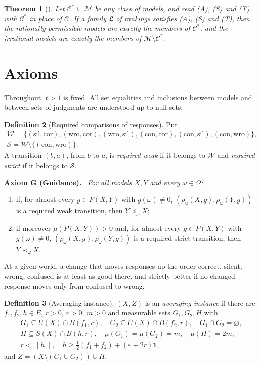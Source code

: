 \documentclass[11pt]{article}
\newtheorem{theorem}{Theorem}[section]
\theoremstyle{definition}
\newtheorem{definition}[theorem]{Definition}
\newenvironment{axiom}[1]{\par\medskip\noindent\textbf{Axiom #1.}\ \itshape}{\par\medskip}
\newcommand{\M}{\mathcal M}
\newcommand{\C}{\mathcal C}
\newcommand{\Lf}{\mathfrak L}
\newcommand{\one}{\mathbf 1}
\newcommand{\cor}{\mathrm{cor}}
\newcommand{\sil}{\mathrm{sil}}
\newcommand{\wro}{\mathrm{wro}}
\newcommand{\con}{\mathrm{con}}
\begin{document}
\begin{theorem}[{\cite[Theorem~3.3(d)]{LDG}}]\label{thm:ldg}
Let $\C^\ast\subseteq\M$ be any class of models, and read (A), (S) and (T) with $\C^\ast$ in place of $\C$. If a family $\Lf$ of rankings satisfies (A), (S) and (T), then the rationally permissible models are exactly the members of $\C^\ast$, and the irrational models are exactly the members of $\M\setminus\C^\ast$.
\end{theorem}

\section{Axioms}\label{sec:axioms}

Throughout, $t>1$ is fixed. All set equalities and inclusions between models and between sets of judgments are understood up to null sets.

\begin{definition}[Required comparisons of responses]\label{def:required}
Put
\begin{gather*}
\mathcal W=\{(\sil,\cor),(\wro,\cor),(\wro,\sil),
(\con,\cor),(\con,\sil),(\con,\wro)\},\\
\mathcal S=\mathcal W\setminus\{(\con,\wro)\}.
\end{gather*}
A transition $(b,a)$, from $b$ to $a$, is \emph{required weak} if it belongs to $\mathcal W$ and \emph{required strict} if it belongs to $\mathcal S$.
\end{definition}

\begin{axiom}{G (Guidance)}
For all models $X,Y$ and every $\omega\in\Omega$:
\begin{enumerate}[label=(\roman*)]
\item if, for almost every $g\in P(X,Y)$ with $g(\omega)\ne0$, $(\rho_\omega(X,g),\rho_\omega(Y,g))$ is a required weak transition, then $Y\preceq_\omega X$;
\item if moreover $\mu(P(X,Y))>0$ and, for almost every $g\in P(X,Y)$ with $g(\omega)\ne0$, $(\rho_\omega(X,g),\rho_\omega(Y,g))$ is a required strict transition, then $Y\prec_\omega X$.
\end{enumerate}
\end{axiom}
\noindent At a given world, a change that moves responses up the order correct, silent, wrong, confused is at least as good there, and strictly better if no changed response moves only from confused to wrong.

\begin{definition}[Averaging instance]\label{def:AV}
$(X,Z)$ is an \emph{averaging instance} if there are $f_1,f_2,h\in E$, $r>0$, $\varepsilon>0$, $m>0$ and measurable sets $G_1,G_2,H$ with
\begin{gather*}
G_1\subseteq U(X)\cap B(f_1,r),\quad G_2\subseteq U(X)\cap B(f_2,r),\quad G_1\cap G_2=\varnothing,\\
H\subseteq S(X)\cap B(h,r),\quad \mu(G_1)=\mu(G_2)=m,\quad \mu(H)=2m,\\
r<\|h\|,\quad h\ge\tfrac12(f_1+f_2)+(\varepsilon+2r)\one,
\end{gather*}
and $Z=(X\setminus(G_1\cup G_2))\cup H$.
\end{definition}
\end{document}
